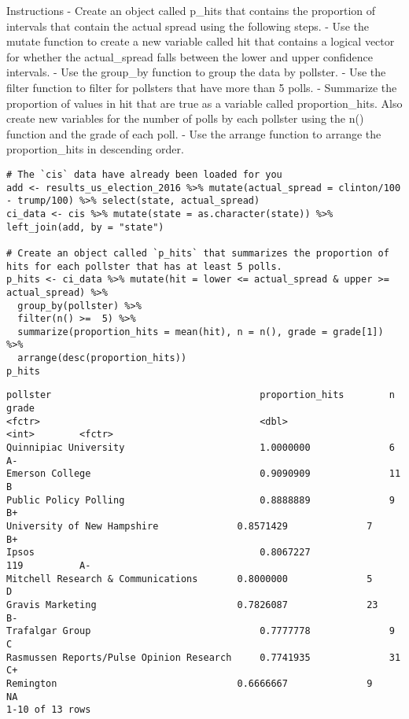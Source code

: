 \documentclass[
]{article}
\begin{document}
Instructions - Create an object called p\_hits that contains the
proportion of intervals that contain the actual spread using the
following steps. - Use the mutate function to create a new variable
called hit that contains a logical vector for whether the actual\_spread
falls between the lower and upper confidence intervals. - Use the
group\_by function to group the data by pollster. - Use the filter
function to filter for pollsters that have more than 5 polls. -
Summarize the proportion of values in hit that are true as a variable
called proportion\_hits. Also create new variables for the number of
polls by each pollster using the n() function and the grade of each
poll. - Use the arrange function to arrange the proportion\_hits in
descending order.

\begin{verbatim}
# The `cis` data have already been loaded for you
add <- results_us_election_2016 %>% mutate(actual_spread = clinton/100 - trump/100) %>% select(state, actual_spread)
ci_data <- cis %>% mutate(state = as.character(state)) %>% left_join(add, by = "state")

# Create an object called `p_hits` that summarizes the proportion of hits for each pollster that has at least 5 polls. 
p_hits <- ci_data %>% mutate(hit = lower <= actual_spread & upper >= actual_spread) %>% 
  group_by(pollster) %>%
  filter(n() >=  5) %>%
  summarize(proportion_hits = mean(hit), n = n(), grade = grade[1]) %>%
  arrange(desc(proportion_hits))
p_hits
\end{verbatim}

\begin{verbatim}
pollster                                     proportion_hits        n            grade
<fctr>                                       <dbl>                  <int>        <fctr>
Quinnipiac University                        1.0000000              6            A-
Emerson College                              0.9090909              11           B
Public Policy Polling                        0.8888889              9            B+
University of New Hampshire              0.8571429              7            B+
Ipsos                                        0.8067227              119          A-
Mitchell Research & Communications       0.8000000              5            D
Gravis Marketing                         0.7826087              23           B-
Trafalgar Group                              0.7777778              9            C
Rasmussen Reports/Pulse Opinion Research     0.7741935              31           C+
Remington                                0.6666667              9            NA
1-10 of 13 rows
\end{verbatim}
\end{document}

